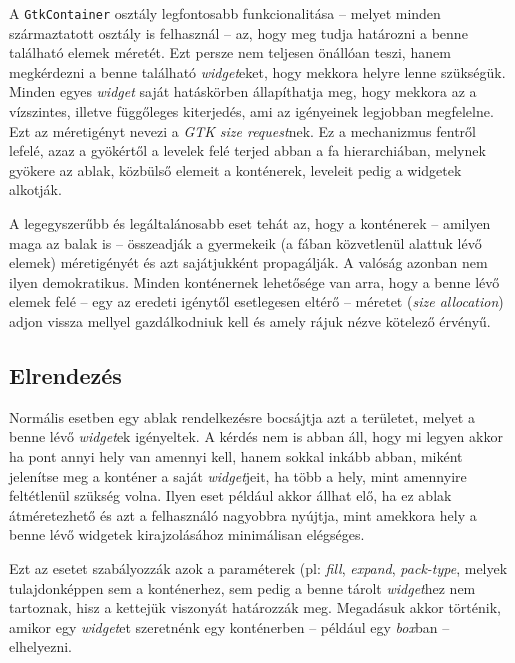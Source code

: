 \documentclass[a4paper,10pt]{article}
\begin{document}
A \texttt{GtkContainer} osztály legfontosabb funkcionalitása -- melyet minden származtatott osztály is felhasznál -- az, hogy meg tudja határozni a benne található elemek méretét. Ezt persze nem teljesen önállóan teszi, hanem megkérdezni a benne található \textit{widget}eket, hogy mekkora helyre lenne szükségük. Minden egyes \textit{widget} saját hatáskörben állapíthatja meg, hogy mekkora az a vízszintes, illetve függőleges kiterjedés, ami az igényeinek legjobban megfelelne. Ezt az méretigényt nevezi a \textit{GTK} \textit{size request}nek. Ez a mechanizmus fentről lefelé, azaz a gyökértől a levelek felé terjed abban a fa hierarchiában, melynek gyökere az ablak, közbülső elemeit a konténerek, leveleit pedig a widgetek alkotják.

A legegyszerűbb és legáltalánosabb eset tehát az, hogy a konténerek -- amilyen maga az balak is -- összeadják a gyermekeik (a fában közvetlenül alattuk lévő elemek) méretigényét és azt sajátjukként propagálják. A valóság azonban nem ilyen demokratikus. Minden konténernek lehetősége van arra, hogy a benne lévő elemek felé -- egy az eredeti igénytől esetlegesen eltérő -- méretet (\textit{size allocation}) adjon vissza mellyel gazdálkodniuk kell és amely rájuk nézve kötelező érvényű.

\subsection{Elrendezés}

Normális esetben egy ablak rendelkezésre bocsájtja azt a területet, melyet a benne lévő \textit{widget}ek igényeltek. A kérdés nem is abban  áll, hogy mi legyen akkor ha pont annyi hely van amennyi kell, hanem sokkal inkább abban, miként jelenítse meg a konténer a saját \textit{widget}jeit, ha több a hely, mint amennyire feltétlenül szükség volna. Ilyen eset például akkor állhat elő, ha ez ablak átméretezhető és azt a felhasználó nagyobbra nyújtja, mint amekkora hely a benne lévő widgetek kirajzolásához minimálisan elégséges.

Ezt az esetet szabályozzák azok a paraméterek (pl: \textit{fill}, \textit{expand}, \textit{pack-type}, melyek tulajdonképpen sem a konténerhez, sem pedig a benne tárolt \textit{widget}hez nem tartoznak, hisz a kettejük viszonyát határozzák meg. Megadásuk akkor történik, amikor egy \textit{widget}et szeretnénk egy konténerben -- például egy \textit{box}ban -- elhelyezni.
\end{document}
